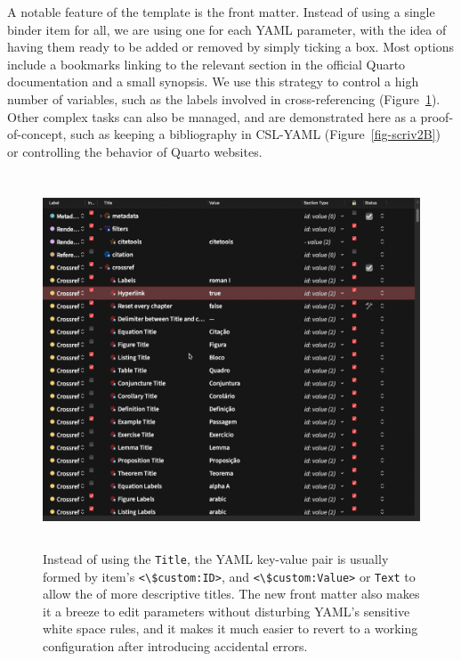 \documentclass[
  12pt,
  a4paper,
  oneside,
  numbers=noenddot,
  titlepage,
  toclink=all,
  toc=bibliography]{scrbook}
\theoremstyle{definition}
\theoremstyle{definition}
\theoremstyle{definition}
\theoremstyle{plain}
\theoremstyle{plain}
\theoremstyle{plain}
\theoremstyle{plain}
\theoremstyle{plain}
\theoremstyle{remark}
\begin{document}
A notable feature of the template is the front matter. Instead of using
a single binder item for all, we are using one for each YAML parameter,
with the idea of having them ready to be added or removed by simply
ticking a box. Most options include a bookmarks linking to the relevant
section in the official Quarto documentation and a small synopsis. We
use this strategy to control a high number of variables, such as the
labels involved in cross-referencing
(\protect\hypertarget{cite_1}{}{\label{cite_1}Figure~\ref{fig-scriv2A}}).
Other complex tasks can also be managed, and are demonstrated here as a
proof-of-concept, such as keeping a bibliography in CSL-YAML
(\protect\hypertarget{cite_2}{}{\label{cite_2}Figure~\ref{fig-scriv2B}})
or controlling the behavior of Quarto websites.

\begin{figure}

{\centering \includegraphics[width=5.20833in,height=4.36458in]{crossref.png}

}

\caption{\label{fig-scriv2A}Instead of using the \texttt{Title}, the
YAML key-value pair is usually formed by item's
\texttt{\textless{}\textbackslash{}\$custom:ID\textgreater{}}, and
\texttt{\textless{}\textbackslash{}\$custom:Value\textgreater{}} or
\texttt{Text} to allow the of more descriptive titles. The new front
matter also makes it a breeze to edit parameters without disturbing
YAML's sensitive white space rules, and it makes it much easier to
revert to a working configuration after introducing accidental errors.}

\end{figure}
\end{document}
